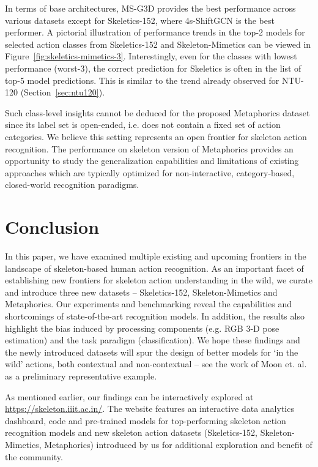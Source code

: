 \documentclass[twocolumn]{svjour3}          \smartqed  \usepackage{graphicx}
\begin{document}
In terms of base architectures, MS-G3D provides the best performance across various datasets except for Skeletics-152, where 4s-ShiftGCN is the best performer.  A pictorial illustration of performance trends in the top-2 models for selected action classes from Skeletics-152 and Skeleton-Mimetics can be viewed in Figure~\ref{fig:skeletics-mimetics-3}. Interestingly, even for the classes with lowest performance (worst-3), the correct prediction for Skeletics is often in the list of top-5 model predictions. This is similar to the trend already observed for NTU-120 (Section~\ref{sec:ntu120}). 

Such class-level insights cannot be deduced for the proposed Metaphorics dataset since its label set is open-ended, i.e. does not contain a fixed set of action categories. We believe this setting represents an open frontier for skeleton action recognition. The performance on skeleton version of Metaphorics provides an opportunity to study the generalization capabilities and limitations of existing approaches which are typically optimized for non-interactive, category-based, closed-world recognition paradigms.


\section{Conclusion}

In this paper, we have examined multiple existing and upcoming frontiers in the landscape of skeleton-based human action recognition. As an important facet of establishing new frontiers for skeleton action understanding in the wild, we curate and introduce three new datasets -- Skeletics-152, Skeleton-Mimetics and Metaphorics. Our experiments and benchmarking reveal the capabilities and shortcomings of state-of-the-art recognition models. In addition, the results also highlight the bias induced by processing components (e.g. RGB 3-D pose estimation) and the task paradigm (classification). We hope these findings and the newly introduced datasets will spur the design of better models for `in the wild'  actions, both contextual and non-contextual  -- see the work of Moon et. al.~\cite{moon2020integralaction} as a preliminary representative example.

As mentioned earlier, our findings can be interactively explored at \url{https://skeleton.iiit.ac.in/}. The website features an interactive data analytics dashboard, code and pre-trained models for top-performing skeleton action recognition models and new skeleton action datasets (Skeletics-152, Skeleton-Mimetics, Metaphorics) introduced by us for additional exploration and benefit of the community.
\end{document}
